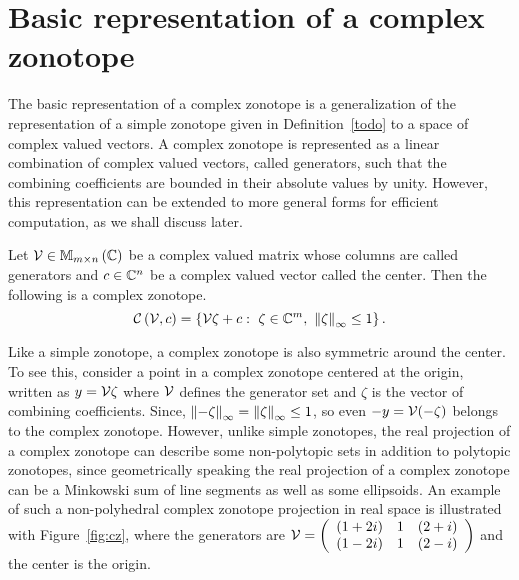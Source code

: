 \section{Basic representation of a complex zonotope}
The basic representation of a complex zonotope is a generalization of
the representation of a simple zonotope given in Definition~\ref{todo}
to a space of complex valued vectors.  A complex zonotope is
represented as a linear combination of complex valued vectors, called
generators, such that the combining coefficients are bounded in their
absolute values by unity.  However, this representation can be
extended to more general forms for efficient computation, as we shall
discuss later.
%
\begin{definition}
Let $\mathcal{V}\in\mathbb{M}_{m\times n}\left(\mathbb{C}\right)$ be a complex valued matrix
whose columns are called generators and $c\in\mathbb{C}^n$ be a
complex valued vector called the center.  Then the following is a
complex zonotope.
%
\begin{equation}
\mathit{\mathcal{C}}\left(\mathcal{V},c\right) = \left\{\mathcal{V}\zeta+c:~\zeta\in\mathbb{C}^m,~\left\|\zeta\right\|_{\infty}\leq 1\right\}.
\end{equation}
%
\end{definition}
%
Like a simple zonotope, a complex zonotope is also symmetric around
the center.  To see this, consider a point in a complex zonotope
centered at the origin, written as $y=\mathcal{V}\zeta$ where $\mathcal{V}$
defines the generator set and $\zeta$ is the vector of combining
coefficients.  Since, $\left\|-\zeta\right\|_{\infty}=\left\|\zeta\right\|_{\infty}\leq 1$, so
even $-y=\mathcal{V}(-\zeta)$ belongs to the complex zonotope.  However, unlike
simple zonotopes, the real projection of a complex zonotope can
describe some non-polytopic sets in addition to polytopic zonotopes,
since geometrically speaking the real projection of a complex zonotope
can be a Minkowski sum of line segments as well as some ellipsoids.
An example of such a non-polyhedral complex zonotope projection in
real space is illustrated with Figure~\ref{fig:cz}, where the
generators are $\mathcal{V}=\left(\begin{array}{lll}(1+2i) & 1 & (2+i)\\(1-2i) & 1
& (2-i)\end{array}\right)$ and the center is the origin.

